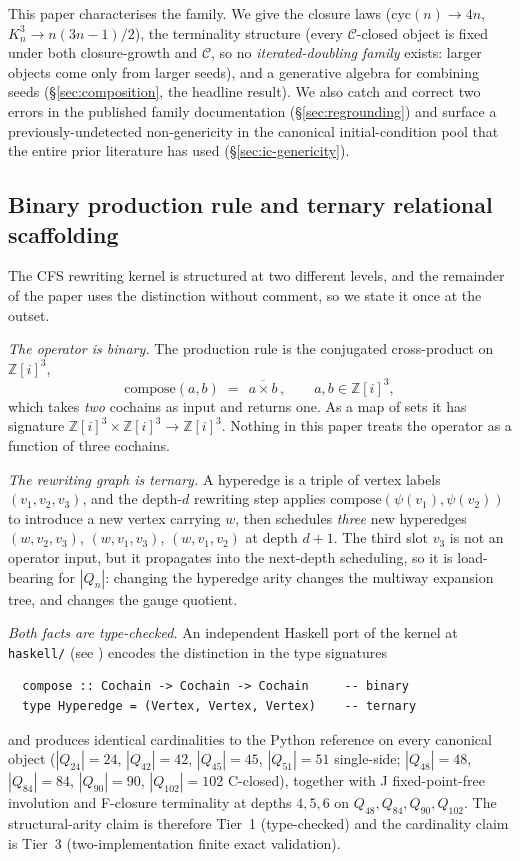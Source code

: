 \documentclass[12pt,a4paper]{article}
\theoremstyle{definition}
\theoremstyle{remark}
\newcommand{\bZ}{\mathbb{Z}}
\newcommand{\Kn}{K_n^3}
\newcommand{\Qn}{Q_n}
\newcommand{\Ccls}{\mathcal{C}}             %
\newcommand{\cyc}{\mathrm{cyc}}
\begin{document}
This paper characterises the family. We give the closure laws
($\cyc(n) \to 4n$, $\Kn \to n(3n{-}1)/2$), the terminality structure
(every $\Ccls$-closed object is fixed under both closure-growth and
$\Ccls$, so no \emph{iterated-doubling family} exists: larger objects
come only from larger seeds), and a generative algebra for combining
seeds (\S\ref{sec:composition}, the headline result). We also catch
and correct two errors in the published family documentation
(\S\ref{sec:regrounding}) and surface a previously-undetected
non-genericity in the canonical initial-condition pool that the entire
prior literature has used (\S\ref{sec:ic-genericity}).


\subsection{Binary production rule and ternary relational scaffolding}\label{sec:intro-arity}

The CFS rewriting kernel is structured at two different levels, and the
remainder of the paper uses the distinction without comment, so we
state it once at the outset.

\emph{The operator is binary.} The production rule is the conjugated
cross-product on $\bZ[i]^3$,
\[
  \mathrm{compose}(a, b) \;=\; \overline{\,a \times b\,},
  \qquad a, b \in \bZ[i]^3,
\]
which takes \emph{two} cochains as input and returns one. As a map of
sets it has signature $\bZ[i]^3 \times \bZ[i]^3 \to \bZ[i]^3$. Nothing
in this paper treats the operator as a function of three cochains.

\emph{The rewriting graph is ternary.} A hyperedge is a triple of
vertex labels $(v_1, v_2, v_3)$, and the depth-$d$ rewriting step
applies $\mathrm{compose}(\psi(v_1), \psi(v_2))$ to introduce a new
vertex carrying $w$, then schedules \emph{three} new hyperedges
$(w, v_2, v_3)$, $(w, v_1, v_3)$, $(w, v_1, v_2)$ at depth $d{+}1$.
The third slot $v_3$ is not an operator input, but it propagates into
the next-depth scheduling, so it is load-bearing for $|\Qn|$: changing
the hyperedge arity changes the multiway expansion tree, and changes
the gauge quotient.

\emph{Both facts are type-checked.} An independent Haskell port of the
kernel at \texttt{haskell/} (see \cite{haskell-cfs-kernel}) encodes the
distinction in the type signatures
\begin{verbatim}
  compose :: Cochain -> Cochain -> Cochain     -- binary
  type Hyperedge = (Vertex, Vertex, Vertex)    -- ternary
\end{verbatim}
and produces identical cardinalities to the Python reference on every
canonical object ($|Q_{24}|=24$, $|Q_{42}|=42$, $|Q_{45}|=45$,
$|Q_{51}|=51$ single-side; $|Q_{48}|=48$, $|Q_{84}|=84$, $|Q_{90}|=90$,
$|Q_{102}|=102$ C-closed), together with J fixed-point-free involution
and F-closure terminality at depths $4, 5, 6$ on $Q_{48}, Q_{84},
Q_{90}, Q_{102}$. The structural-arity claim is therefore
Tier~1 (type-checked) and the cardinality claim is Tier~3
(two-implementation finite exact validation).
\end{document}
